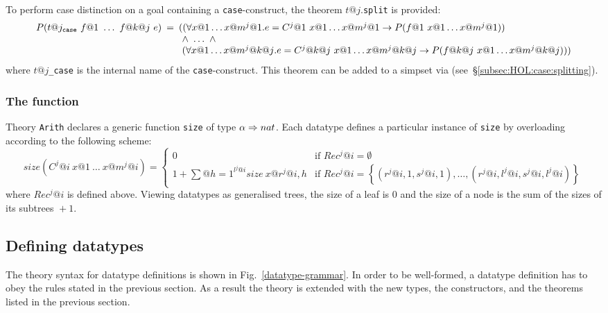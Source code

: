 To perform case distinction on a goal containing a \texttt{case}-construct,
the theorem $t@j.$\texttt{split} is provided:
\[
\begin{array}{@{}rcl@{}}
P(t@j_\mathtt{case}~f@1~\dots~f@{k@j}~e) &\!\!\!=&
\!\!\! ((\forall x@1 \dots x@{m^j@1}. e = C^j@1~x@1\dots x@{m^j@1} \to
                             P(f@1~x@1\dots x@{m^j@1})) \\
&&\!\!\! ~\land~ \dots ~\land \\
&&~\!\!\! (\forall x@1 \dots x@{m^j@{k@j}}. e = C^j@{k@j}~x@1\dots x@{m^j@{k@j}} \to
                             P(f@{k@j}~x@1\dots x@{m^j@{k@j}})))
\end{array}
\]
where $t@j$\texttt{_case} is the internal name of the \texttt{case}-construct.
This theorem can be added to a simpset via 
(see~\S\ref{subsec:HOL:case:splitting}).

\subsubsection{The function }\label{sec:HOL:size}

Theory \texttt{Arith} declares a generic function \texttt{size} of type
$\alpha\Rightarrow nat$.  Each datatype defines a particular instance of \texttt{size}
by overloading according to the following scheme:
\[
size(C^j@i~x@1~\dots~x@{m^j@i}) = \!
\left\{
\begin{array}{ll}
0 & \!\mbox{if $Rec^j@i = \emptyset$} \\
1+\sum\limits@{h=1}^{l^j@i}size~x@{r^j@{i,h}} &
 \!\mbox{if $Rec^j@i = \left\{\left(r^j@{i,1},s^j@{i,1}\right),\ldots,
  \left(r^j@{i,l^j@i},s^j@{i,l^j@i}\right)\right\}$}
\end{array}
\right.
\]
where $Rec^j@i$ is defined above.  Viewing datatypes as generalised trees, the
size of a leaf is 0 and the size of a node is the sum of the sizes of its
subtrees ${}+1$.

\subsection{Defining datatypes}

The theory syntax for datatype definitions is shown in
Fig.~\ref{datatype-grammar}.  In order to be well-formed, a datatype
definition has to obey the rules stated in the previous section.  As a result
the theory is extended with the new types, the constructors, and the theorems
listed in the previous section.

